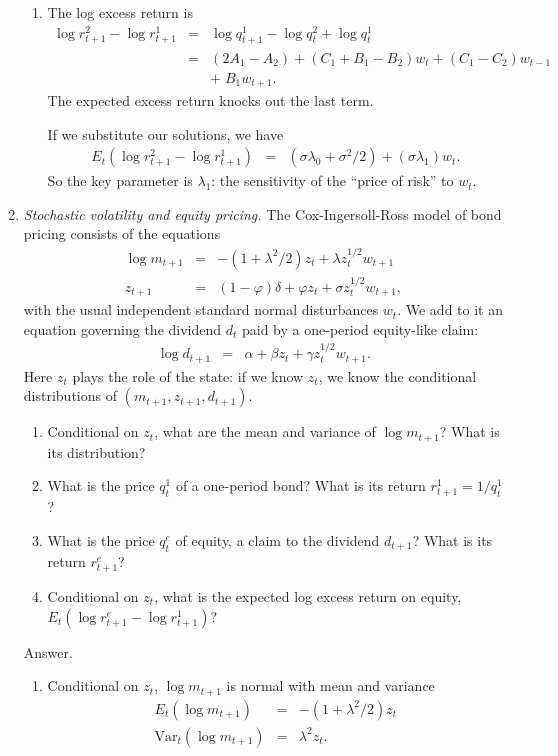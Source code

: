 \documentclass[11pt]{article}
\begin{document}
\begin{enumerate}
\begin{enumerate}
\item The log excess return is
\begin{eqnarray*}
    \log r^2_{t+1} - \log r^1_{t+1} &=& \log q^1_{t+1} - \log q^2_t + \log q^1_t \\
            &=& (2 A_1 - A_2) + (C_1 + B_1 - B_2) w_t + (C_1 - C_2) w_{t-1} \\
            &&        + \; B_1 w_{t+1} .
\end{eqnarray*}
The expected excess return knocks out the last term.

If we substitute our solutions, we have
\begin{eqnarray*}
   E_t \left( \log r^2_{t+1} - \log r^1_{t+1}\right)
            &=& (\sigma \lambda_0 + \sigma^2/2)  + (\sigma\lambda_1) w_t  .
\end{eqnarray*}
So the key parameter is $\lambda_1$:  the sensitivity of the ``price of risk''
to $w_t$.
\end{enumerate}

\item  {\it Stochastic volatility and equity pricing.\/}
The Cox-Ingersoll-Ross model of bond pricing consists of the equations
\begin{eqnarray*}
    \log m_{t+1} &=& -(1+\lambda^2/2) z_{t} + \lambda z_t^{1/2} w_{t+1} \\
        z_{t+1}  &=& (1-\varphi)\delta + \varphi z_t + \sigma z_t^{1/2} w_{t+1} ,
\end{eqnarray*}
with the usual independent standard normal disturbances $w_t$.
We add to it an equation governing the dividend $d_t$ paid by a one-period
equity-like claim:
\begin{eqnarray*}
    \log d_{t+1} &=& \alpha + \beta z_t + \gamma z_t^{1/2} w_{t+1} .
\end{eqnarray*}
Here $z_t$ plays the role of the state:  if we know $z_t$, we know the conditional
distributions of $ (m_{t+1}, z_{t+1}, d_{t+1})$.

\begin{enumerate}
\item  Conditional on $z_t$,
what are the mean and variance of $\log m_{t+1}$?
What is its distribution?
\item  What is the price $q^1_t$ of a one-period bond?
What is its return $ r^1_{t+1} = 1/q^1_t$?
\item  What is the price $q^e_t$ of equity, a claim to the dividend
$d_{t+1}$?
What is its return $r^e_{t+1}$?
\item  Conditional on $z_t$, what is the expected log excess return on equity,
$E_t (\log r^e_{t+1} - \log r^1_{t+1})$?
\end{enumerate}
%
Answer.
\begin{enumerate}
\item  Conditional on $z_t$, $\log m_{t+1}$ is normal with mean and variance
\begin{eqnarray*}
    E_t (\log m_{t+1}) &=& -(1+\lambda^2/2) z_{t} \\
    \mbox{Var}_t (\log m_{t+1}) &=& \lambda^2 z_t .
\end{eqnarray*}


\end{enumerate}
\end{enumerate}
\end{document}
